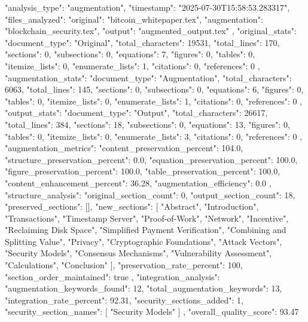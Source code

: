 {
  "analysis_type": "augmentation",
  "timestamp": "2025-07-30T15:58:53.283317",
  "files_analyzed": {
    "original": "bitcoin_whitepaper.tex",
    "augmentation": "blockchain_security.tex",
    "output": "augmented_output.tex"
  },
  "original_stats": {
    "document_type": "Original",
    "total_characters": 19531,
    "total_lines": 170,
    "sections": 0,
    "subsections": 0,
    "equations": 7,
    "figures": 0,
    "tables": 0,
    "itemize_lists": 0,
    "enumerate_lists": 1,
    "citations": 0,
    "references": 0
  },
  "augmentation_stats": {
    "document_type": "Augmentation",
    "total_characters": 6063,
    "total_lines": 145,
    "sections": 0,
    "subsections": 0,
    "equations": 6,
    "figures": 0,
    "tables": 0,
    "itemize_lists": 0,
    "enumerate_lists": 1,
    "citations": 0,
    "references": 0
  },
  "output_stats": {
    "document_type": "Output",
    "total_characters": 26617,
    "total_lines": 384,
    "sections": 18,
    "subsections": 0,
    "equations": 13,
    "figures": 0,
    "tables": 0,
    "itemize_lists": 0,
    "enumerate_lists": 3,
    "citations": 0,
    "references": 0
  },
  "augmentation_metrics": {
    "content_preservation_percent": 104.0,
    "structure_preservation_percent": 0.0,
    "equation_preservation_percent": 100.0,
    "figure_preservation_percent": 100.0,
    "table_preservation_percent": 100.0,
    "content_enhancement_percent": 36.28,
    "augmentation_efficiency": 0.0
  },
  "structure_analysis": {
    "original_section_count": 0,
    "output_section_count": 18,
    "preserved_sections": [],
    "new_sections": [
      "Abstract",
      "Introduction",
      "Transactions",
      "Timestamp Server",
      "Proof-of-Work",
      "Network",
      "Incentive",
      "Reclaiming Disk Space",
      "Simplified Payment Verification",
      "Combining and Splitting Value",
      "Privacy",
      "Cryptographic Foundations",
      "Attack Vectors",
      "Security Models",
      "Consensus Mechanisms",
      "Vulnerability Assessment",
      "Calculations",
      "Conclusion"
    ],
    "preservation_rate_percent": 100,
    "section_order_maintained": true
  },
  "integration_analysis": {
    "augmentation_keywords_found": 12,
    "total_augmentation_keywords": 13,
    "integration_rate_percent": 92.31,
    "security_sections_added": 1,
    "security_section_names": [
      "Security Models"
    ]
  },
  "overall_quality_score": 93.47
}